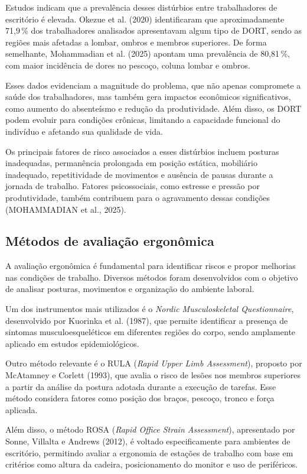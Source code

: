 Estudos indicam que a prevalência desses distúrbios entre trabalhadores de
escritório é elevada. Okezue et al. (2020) identificaram que aproximadamente
71,9\,\% dos trabalhadores analisados apresentavam algum tipo de DORT, sendo as
regiões mais afetadas a lombar, ombros e membros superiores. De forma semelhante,
Mohammadian et al. (2025) apontam uma prevalência de 80,81\,\%, com maior incidência
de dores no pescoço, coluna lombar e ombros.

Esses dados evidenciam a magnitude do problema, que não apenas compromete a saúde
dos trabalhadores, mas também gera impactos econômicos significativos, como aumento
do absenteísmo e redução da produtividade. Além disso, os DORT podem evoluir para
condições crônicas, limitando a capacidade funcional do indivíduo e afetando sua
qualidade de vida.

Os principais fatores de risco associados a esses distúrbios incluem posturas
inadequadas, permanência prolongada em posição estática, mobiliário inadequado,
repetitividade de movimentos e ausência de pausas durante a jornada de trabalho.
Fatores psicossociais, como estresse e pressão por produtividade, também contribuem
para o agravamento dessas condições (MOHAMMADIAN et al., 2025).

\subsection{Métodos de avaliação ergonômica}

A avaliação ergonômica é fundamental para identificar riscos e propor melhorias nas
condições de trabalho. Diversos métodos foram desenvolvidos com o objetivo de
analisar posturas, movimentos e organização do ambiente laboral.

Um dos instrumentos mais utilizados é o \emph{Nordic Musculoskeletal Questionnaire},
desenvolvido por Kuorinka et al. (1987), que permite identificar a presença de
sintomas musculoesqueléticos em diferentes regiões do corpo, sendo amplamente
aplicado em estudos epidemiológicos.

Outro método relevante é o RULA (\emph{Rapid Upper Limb Assessment}), proposto por
McAtamney e Corlett (1993), que avalia o risco de lesões nos membros superiores a
partir da análise da postura adotada durante a execução de tarefas. Esse método
considera fatores como posição dos braços, pescoço, tronco e força aplicada.

Além disso, o método ROSA (\emph{Rapid Office Strain Assessment}), apresentado por
Sonne, Villalta e Andrews (2012), é voltado especificamente para ambientes de escritório,
permitindo avaliar a ergonomia de estações de trabalho com base em critérios como
altura da cadeira, posicionamento do monitor e uso de periféricos.

